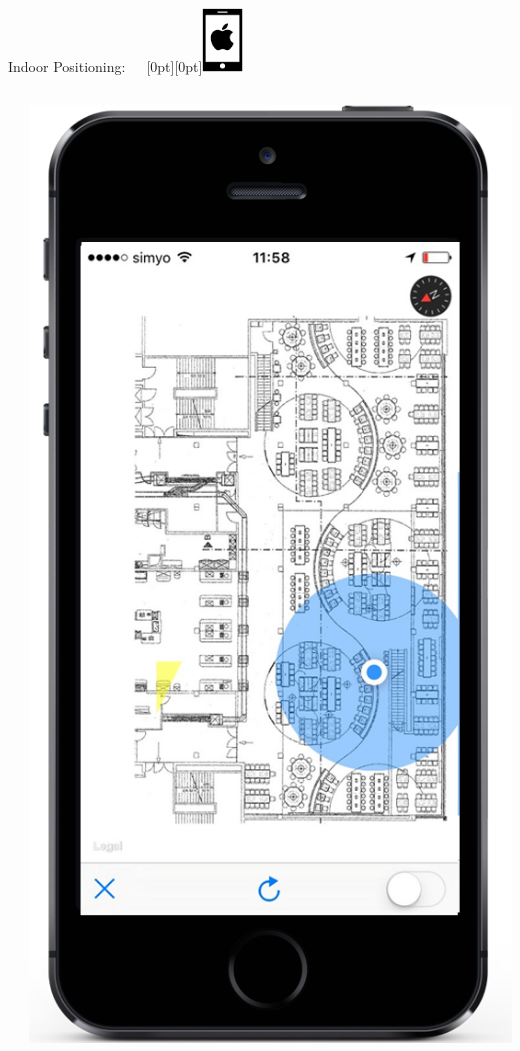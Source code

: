 \documentclass[11pt]{beamer}
\begin{document}
\begin{frame}{Indoor Positioning:~~~\raisebox{-10pt}[0pt][0pt]{\includegraphics[width=0.08\textwidth]{tech-stack-apple}}}
\begin{columns}[T]
\begin{column}{.6\textwidth}
\begin{itemize}
  \end{itemize}
  \end{column}
  \begin{column}{.4\textwidth}
  \includegraphics[scale=0.25]{applesignalweak}
  \end{column}
\end{columns}

\end{frame}
\end{document}
